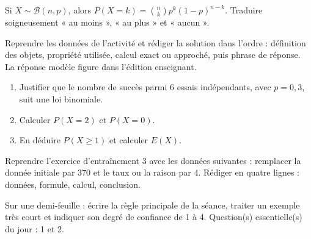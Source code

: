 \begin{traceecrite}Si $X\sim\mathcal B(n,p)$, alors $P(X=k)=\binom nkp^k(1-p)^{n-k}$. Traduire soigneusement « au moins », « au plus » et « aucun ».\end{traceecrite}

\begin{exemple}
Reprendre les données de l'activité et rédiger la solution dans l'ordre : définition des objets, propriété utilisée, calcul exact ou approché, puis phrase de réponse. La réponse modèle figure dans l'édition enseignant.
\end{exemple}

\begin{exercice}[-- essentiel]
\begin{enumerate}\item Justifier que le nombre de succès parmi $6$ essais indépendants, avec $p=0{,}3$, suit une loi binomiale.\item Calculer $P(X=2)$ et $P(X=0)$.\item En déduire $P(X\geq1)$ et calculer $E(X)$.\end{enumerate}
\end{exercice}


\begin{dm}Reprendre l'exercice d'entraînement 3 avec les données suivantes : remplacer la donnée initiale par $370$ et le taux ou la raison par $4$. Rédiger en quatre lignes : données, formule, calcul, conclusion.\end{dm}

\begin{sortie}Sur une demi-feuille : écrire la règle principale de la séance, traiter un exemple très court et indiquer son degré de confiance de 1 à 4. Question(s) essentielle(s) du jour : 1 et 2.\end{sortie}

